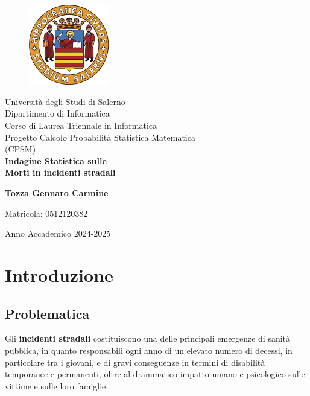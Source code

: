 \documentclass[14pt, openany, titlepage]{report} %
\begin{document}

\begin{titlepage}
\begin{center}
    \begin{figure}
        \includegraphics[width=3.5cm, height=3.5cm]{unisa.png}
        \centering
    \end{figure}
    {\Large Università degli Studi di Salerno}\\[0.2truecm]
    {\large Dipartimento di Informatica\\Corso di Laurea Triennale in Informatica}\\
    \hrulefill
    \vfill
    {\large Progetto Calcolo Probabilità Statistica Matematica\\(CPSM)}\\[0.1truecm]
    \vfill\vfill
    {\LARGE {\bf Indagine Statistica sulle\\[0.1truecm]Morti in incidenti stradali}}
    \vfill\vfill
    
    \hfill  \textbf{Tozza Gennaro Carmine}
    \centerline{\hfill Matricola: 0512120382}
    
    \vfill
    \hrulefill 
    \begin{center} Anno Accademico 2024-2025 \end{center}
\end{center}
\end{titlepage}

\tableofcontents

\chapter{Introduzione}
\section{Problematica}
Gli \textbf{incidenti stradali} costituiscono una delle principali emergenze 
di sanità pubblica, in quanto responsabili ogni anno di un elevato 
numero di decessi, in particolare tra i giovani, e di gravi conseguenze
 in termini di disabilità temporanee e permanenti, oltre al drammatico impatto umano e psicologico sulle vittime e 
 sulle loro famiglie. 
\noindent
\end{document}
